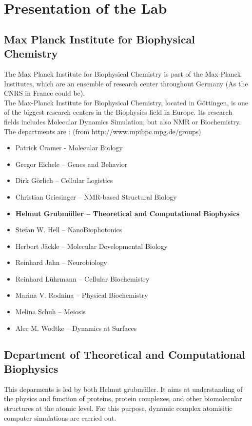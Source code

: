 \documentclass[12pt,twoside,a4paper]{report}
\begin{document}
\tableofcontents

\chapter{Presentation of the Lab}
\section*{Max Planck Institute for Biophysical Chemistry}

The Max Planck Institute for Biophysical Chemistry is part of the Max-Planck Institutes, which are an ensemble of research center throughout Germany (As the CNRS in France could be).\\

The Max-Planck Institute for Biophysical Chemistry, located in Göttingen, is one of the biggest research centers in the Biophysics field in Europe. Its research fields includes Molecular Dynamics Simulation, but also NMR or Biochemistry.\\
The departments are : (from http://www.mpibpc.mpg.de/groups)
\begin{itemize}
\item Patrick Cramer - Molecular Biology
\item Gregor Eichele – Genes and Behavior
\item Dirk Görlich – Cellular Logistics
\item Christian Griesinger – NMR-based Structural  Biology
\item \textbf{Helmut Grubmüller – Theoretical and Computational Biophysics}
\item Stefan W. Hell – NanoBiophotonics
\item Herbert Jäckle – Molecular Developmental Biology
\item Reinhard Jahn – Neurobiology
\item Reinhard Lührmann – Cellular Biochemistry
\item Marina V. Rodnina – Physical Biochemistry
\item Melina Schuh – Meiosis 
\item Alec M. Wodtke – Dynamics at Surfaces
\end{itemize}

\section*{Department of Theoretical and Computational Biophysics}

This deparments is led by both Helmut grubmüller. It aims at understanding of the physics and function of proteins, protein complexes, and other biomolecular structures at the atomic level. For this purpose, dynamic complex atomisitic computer simulations are carried out.\\
\end{document}
